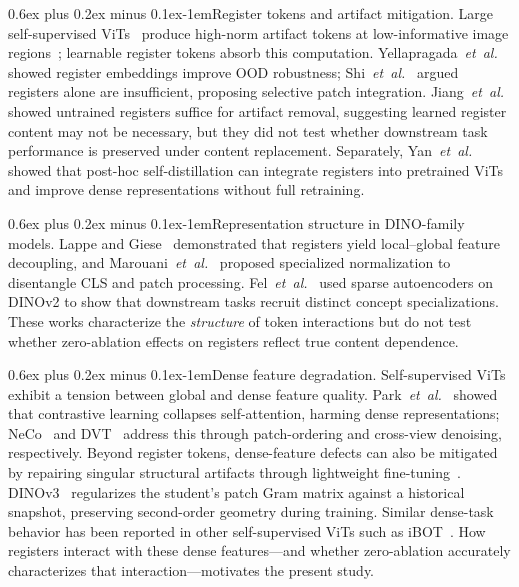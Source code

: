 \documentclass[10pt,twocolumn,letterpaper]{article}
\makeatletter
\renewcommand{\paragraph}{\@startsection{paragraph}{4}{\z@}%
  {0.6ex plus 0.2ex minus 0.1ex}{-1em}{\normalfont\normalsize\bfseries}}
\makeatother
\begin{document}
\paragraph{Register tokens and artifact mitigation.}
Large self-supervised ViTs~\cite{dosovitskiy2021vit,caron2021dino,oquab2024dinov2} produce high-norm artifact tokens at low-informative image regions~\cite{darcet2024registers}; learnable register tokens absorb this computation.
Yellapragada~\textit{et~al.}~\cite{yellapragada2025leveraging} showed register embeddings improve OOD robustness; Shi~\textit{et~al.}~\cite{shi2026morethan} argued registers alone are insufficient, proposing selective patch integration.
Jiang~\textit{et~al.}~\cite{jiang2025notrained} showed untrained registers suffice for artifact removal, suggesting learned register content may not be necessary, but they did not test whether downstream task performance is preserved under content replacement.
Separately, Yan~\textit{et~al.}~\cite{yan2025selfdistilled} showed that post-hoc self-distillation can integrate registers into pretrained ViTs and improve dense representations without full retraining.

\paragraph{Representation structure in DINO-family models.}
Lappe and Giese~\cite{lappe2025decoupling} demonstrated that registers yield local--global feature decoupling, and Marouani~\textit{et~al.}~\cite{marouani2026revisiting} proposed specialized normalization to disentangle CLS and patch processing.
Fel~\textit{et~al.}~\cite{fel2026rabbithull} used sparse autoencoders on DINOv2 to show that downstream tasks recruit distinct concept specializations.
These works characterize the \emph{structure} of token interactions but do not test whether zero-ablation effects on registers reflect true content dependence.

\paragraph{Dense feature degradation.}
Self-supervised ViTs exhibit a tension between global and dense feature quality.
Park~\textit{et~al.}~\cite{park2023whatssl} showed that contrastive learning collapses self-attention, harming dense representations; NeCo~\cite{pariza2025neco} and DVT~\cite{yang2024dvt} address this through patch-ordering and cross-view denoising, respectively.
Beyond register tokens, dense-feature defects can also be mitigated by repairing singular structural artifacts through lightweight fine-tuning~\cite{wang2024sinder}.
DINOv3~\cite{simeoni2025dinov3} regularizes the student's patch Gram matrix against a historical snapshot, preserving second-order geometry during training.
Similar dense-task behavior has been reported in other self-supervised ViTs such as iBOT~\cite{zhou2022ibot}.
How registers interact with these dense features---and whether zero-ablation accurately characterizes that interaction---motivates the present study.
\end{document}
